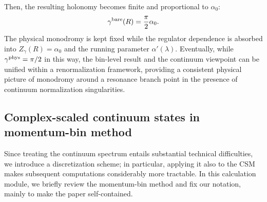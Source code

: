 Then, the resulting holonomy becomes finite and proportional to $\alpha_0$:
\begin{align}
    \gamma^{\mathrm{bare}}(R)=\frac{\pi}{2}\alpha_0.
\end{align}
The physical monodromy is kept fixed while the regulator dependence is absorbed into $Z_{\gamma}(R)=\alpha_0$ and the running parameter $\alpha'(\lambda)$.
Eventually, while~$\gamma^{\mathrm{phys}}=\pi/2$ in this way, the bin-level result and the continuum viewpoint can be unified within a renormalization framework, providing a consistent physical picture of monodromy around a resonance branch point in the presence of continuum normalization singularities.
\subsection{Complex-scaled continuum states in momentum-bin method}\label{src:2512_24528:sec:bin_method}
Since treating the continuum spectrum entails substantial technical difficulties, we introduce a discretization scheme; in particular, applying it also to the CSM makes subsequent computations considerably more tractable.
In this calculation module, we briefly review the momentum-bin method and fix our notation, mainly to make the paper self-contained.

